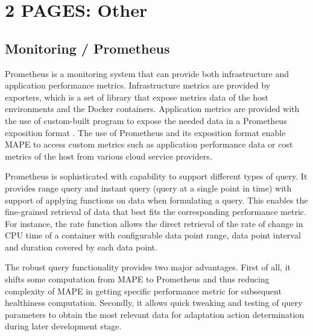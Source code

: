 \documentclass{seal_thesis}
\begin{document}
\section{2 PAGES: Other}
\subsection{Monitoring / Prometheus}

Prometheus  is a monitoring system that can provide both infrastructure and application performance metrics.
Infrastructure metrics are provided by exporters, which is a set of library that expose metrics data of the host environments and the Docker containers.
Application metrics are provided with the use of custom-built program to expose the needed data in a Prometheus exposition format .
The use of Prometheus and its exposition format enable MAPE to access custom metrics such as application performance data or cost metrics of the host from various cloud service providers.

Prometheus is sophisticated with capability to support different types of query.
It provides range query and instant query (query at a single point in time) with support of applying functions on data when formulating a query.
This enables the fine-grained retrieval of data that best fits the corresponding performance metric.
For instance, the rate function allows the direct retrieval of the rate of change in CPU time of a container with configurable data point range, data point interval and duration covered by each data point.

The robust query functionality provides two major advantages.
First of all, it shifts some computation from MAPE to Prometheus and thus reducing complexity of MAPE in getting specific performance metric for subsequent healthiness computation.
Secondly, it allows quick tweaking and testing of query parameters to obtain the most relevant data for adaptation action determination during later development stage. 
\end{document}

